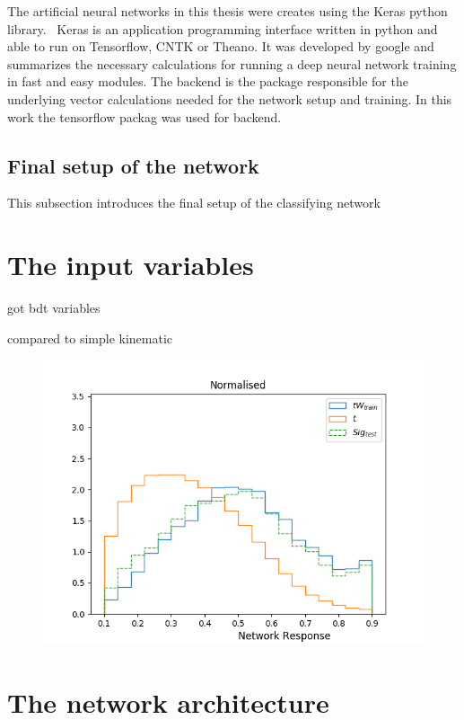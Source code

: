 The artificial neural networks in this thesis were creates using the Keras python library.~\cite{chollet2015keras} 
Keras is an application programming interface written in python and able to run on Tensorflow, CNTK or Theano. It was developed by google and summarizes the necessary calculations for running a deep neural network training in fast and easy modules.
The backend is the package responsible for the underlying vector calculations needed for the network setup and training. In this work the tensorflow packag was used for backend.~\cite{chollet2015keras}

\subsection{Final setup of the network}

This subsection introduces the final setup of the classifying network

\cite{tensorflow2015-whitepaper}

\section{The input variables}

got bdt variables

compared to simple kinematic

\begin{figure}
	\centering
	\includegraphics[width=\figwidth]{figures_simpleNN/test_simple.png}
\end{figure}



\section{The network architecture}

